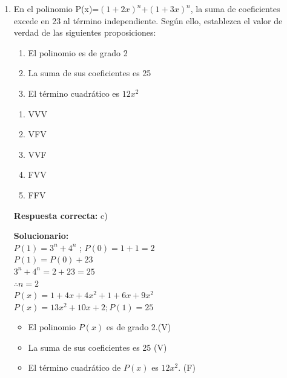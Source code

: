 \begin{enumerate}
	
	\item En el polinomio P(x)=$(1+2x)^n$+$(1+3x)^n$, la suma de coeficientes excede en 23 al término independiente. Según ello, establezca el valor de verdad de las siguientes proposiciones:
	\begin{enumerate}[label=\Roman*.]
		\item El polinomio es de grado 2
		\item La suma de sus coeficientes es 25
		\item El término cuadrático es $12x^2$
	\end{enumerate}
	
	
	\begin{enumerate}[label=\alph*)]
		\item VVV
		\item VFV
		\item VVF
		\item FVV
		\item FFV
	\end{enumerate}
	
	\textbf{Respuesta correcta:} c)
	
	\vspace{2mm}
	\textbf{Solucionario:}\\
	
	$P(1)=3^n+4^n$ ; $P(0)=1+1=2$\\
	$P(1)=P(0)+23$\\
	$3^n+4^n=2+23=25$\\    
	$\therefore n = 2$\\
	$P(x)=1+4x+4x^2+1+6x+9x^2$\\
	$P(x)=13x^2+10x+2; P(1)=25$\\
	
	\begin{itemize}[label=*]
		\item El polinomio $P(x)$ es de grado 2.(V)
		\item La suma de sus coeficientes es 25 (V)
		\item El término cuadrático de $P(x)$ es $12x^2$. (F)
	\end{itemize}
	
	
	
	
\end{enumerate}

